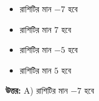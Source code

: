 \documentclass[12pt, a4paper]{article}
\begin{document}
\begin{itemize}[label={}, leftmargin=1cm, itemsep=0.5em]
    \item[\textbf{A)}] রাশিটির মান $-7$ হবে
    \item[\textbf{B)}] রাশিটির মান $7$ হবে
    \item[\textbf{C)}] রাশিটির মান $-5$ হবে
    \item[\textbf{D)}] রাশিটির মান $5$ হবে
\end{itemize}

\vspace{0.5em}
\begin{tcolorbox}[answerbox]
    \textbf{\color{success} উত্তর:} A) রাশিটির মান $-7$ হবে
\end{tcolorbox}
\vspace{1em}
\end{document}
